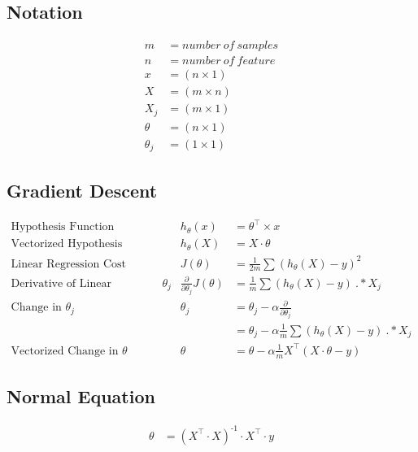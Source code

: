 \documentclass[11pt, oneside]{article}
\begin{document}
\subsection{Notation}
	\begin{align*}
		m &= number\ of\ samples\\
		n &= number\ of\ feature\\
		x &= (n \times 1)\\
		X &= (m \times n)\\
		X_j &= (m \times 1)\\
		\theta &= (n \times 1)\\
		\theta_j &= (1 \times 1)
	\end{align*}

\subsection{Gradient Descent}
	\begin{align*}
		\text{Hypothesis Function} && 
			h_\theta(x) &= \theta^\intercal \times x\\
		\text{Vectorized Hypothesis Function} && 
			h_\theta(X) &= X \cdot \theta \\
		\text{Linear Regression Cost Function} && 
			J(\theta) &= \frac{1}{2 m} \sum (h_\theta(X) - y)^2 \\
		\text{Derivative of Linear Regression CF wrt $\theta_j$} && 
			\frac{\partial}{\partial \theta_j} J(\theta) &= \frac{1}{m} \sum (h_\theta(X) - y)\ .* X_j \\
		\text{Change in $\theta_j$} &&
			\theta_j &= \theta_j - \alpha \frac{\partial}{\partial \theta_j} \\
		\text{} &&
			&= \theta_j - \alpha \frac{1}{m} \sum (h_\theta(X) - y)\ .* X_j \\
		\text{Vectorized Change in $\theta$} &&
			\theta &= \theta - \alpha \frac{1}{m} X^\intercal (X \cdot \theta - y) 
	\end{align*}

\subsection{Normal Equation}
	\begin{align*}
		\theta &= (X^\intercal \cdot X)^\text{-1} \cdot X^\intercal \cdot y
	\end{align*}

\clearpage



\end{document}
